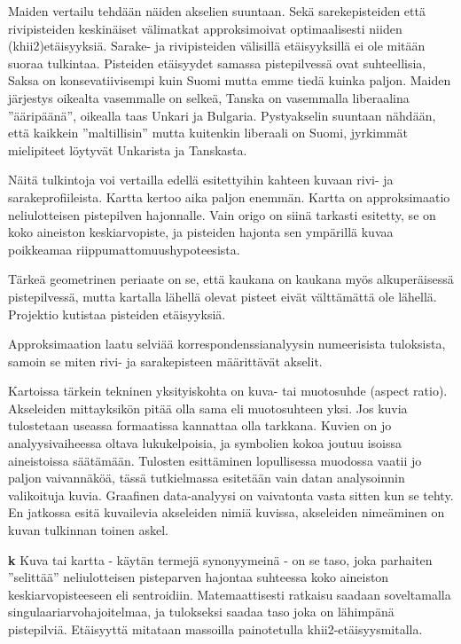 \documentclass[
  finnish,
]{book}
\begin{document}
Maiden vertailu tehdään näiden akselien suuntaan. Sekä sarekepisteiden että
rivipisteiden keskinäiset välimatkat approksimoivat optimaalisesti niiden
(khii2)etäisyyksiä. Sarake- ja rivipisteiden välisillä etäisyyksillä ei ole
mitään suoraa tulkintaa. Pisteiden etäisyydet samassa pistepilvessä ovat
suhteellisia, Saksa on konsevatiivisempi kuin Suomi mutta emme tiedä kuinka paljon.
Maiden järjestys oikealta vasemmalle on selkeä, Tanska on vasemmalla
liberaalina ''ääripäänä'', oikealla taas Unkari ja Bulgaria. Pystyakselin suuntaan
nähdään, että kaikkein ''maltillisin'' mutta kuitenkin liberaali on Suomi,
jyrkimmät mielipiteet löytyvät Unkarista ja Tanskasta.

Näitä tulkintoja voi vertailla edellä esitettyihin kahteen kuvaan rivi- ja
sarakeprofiileista. Kartta kertoo aika paljon enemmän.
Kartta on approksimaatio neliulotteisen pistepilven hajonnalle. Vain origo on
siinä tarkasti esitetty, se on koko aineiston keskiarvopiste, ja pisteiden
hajonta sen ympärillä kuvaa poikkeamaa riippumattomuushypoteesista.

Tärkeä geometrinen periaate on se, että kaukana on kaukana myös alkuperäisessä
pistepilvessä, mutta kartalla lähellä olevat pisteet eivät välttämättä ole lähellä.
Projektio kutistaa pisteiden etäisyyksiä.

Approksimaation laatu selviää korrespondenssianalyysin numeerisista tuloksista,
samoin se miten rivi- ja sarakepisteen määrittävät akselit.

Kartoissa tärkein tekninen yksityiskohta on kuva- tai muotosuhde (aspect ratio).
Akseleiden mittayksikön pitää olla sama eli muotosuhteen yksi. Jos kuvia
tulostetaan useassa formaatissa kannattaa olla tarkkana. Kuvien on jo
analyysivaiheessa oltava lukukelpoisia, ja symbolien kokoa joutuu isoissa
aineistoissa säätämään. Tulosten esittäminen lopullisessa muodossa vaatii jo
paljon vaivannäköä, tässä tutkielmassa esitetään vain datan analysoinnin
valikoituja kuvia. Graafinen data-analyysi on vaivatonta vasta sitten kun se tehty.
En jatkossa esitä kuvailevia akseleiden nimiä kuvissa,
akseleiden nimeäminen on kuvan tulkinnan toinen askel.

\textbf{k} Kuva tai kartta - käytän termejä synonyymeinä - on se taso, joka parhaiten
''selittää'' neliulotteisen pisteparven hajontaa suhteessa koko aineiston
keskiarvopisteeseen eli sentroidiin. Matemaattisesti ratkaisu saadaan
soveltamalla singulaariarvohajoitelmaa, ja tulokseksi saadaa taso joka on
lähimpänä pistepilviä. Etäisyyttä mitataan massoilla painotetulla
khii2-etäisyysmitalla.
\end{document}
